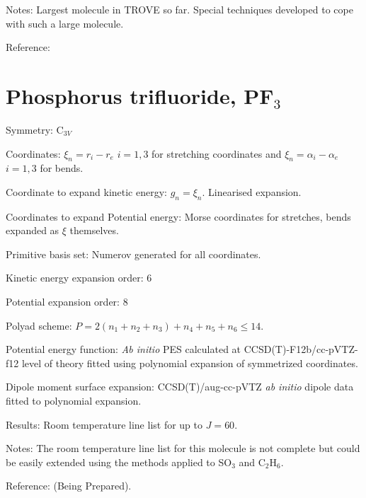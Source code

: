 Notes: Largest molecule in TROVE so far. Special techniques developed to cope with such a large molecule.

Reference: \cite{jt729}


\section{Phosphorus trifluoride, PF$_3$}

Symmetry: C$_{3V}$

Coordinates: $\xi_n = r_i - r_e$ $i=1,3$ for stretching coordinates and $\xi_n = \alpha_i - \alpha_e$ $i=1,3$ for bends.

Coordinate to expand kinetic energy: $g_n = \xi_n$. Linearised expansion.

Coordinates to expand Potential energy: Morse coordinates for stretches, bends expanded as $\xi$ themselves.

Primitive basis set: Numerov generated for all coordinates.

Kinetic energy expansion order: 6

Potential expansion order: 8

Polyad scheme: $P = 2(n_1 + n_2 + n_3) + n_4 + n_5 + n_6 \leq 14$.

Potential energy function:  \textit{Ab initio} PES calculated at CCSD(T)-F12b/cc-pVTZ-f12 level of theory fitted using
polynomial expansion of symmetrized coordinates.

Dipole moment surface expansion: CCSD(T)/aug-cc-pVTZ \textit{ab initio} dipole data fitted to polynomial expansion.

Results: Room temperature line list for up to $J = 60$.

Notes: The room temperature line list for this molecule is not complete but could be easily extended using the methods applied
to SO$_3$ and C$_2$H$_6$.

Reference: (Being Prepared).
